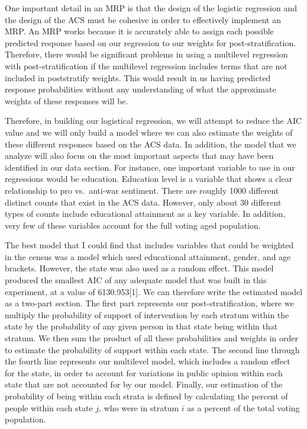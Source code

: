 \documentclass[
  11pt,
]{article}
\begin{document}
One important detail in an MRP is that the design of the logistic
regression and the design of the ACS must be cohesive in order to
effectively implement an MRP. An MRP works because it is accurately able
to assign each possible predicted response based on our regression to
our weights for post-stratification. Therefore, there would be
significant problems in using a multilevel regression with
post-stratification if the multilevel regression includes terms that are
not included in poststratify weights. This would result in us having
predicted response probabilities without any understanding of what the
approximate weights of these responses will be.

Therefore, in building our logistical regression, we will attempt to
reduce the AIC value and we will only build a model where we can also
estimate the weights of these different responses based on the ACS data.
In addition, the model that we analyze will also focus on the most
important aspects that may have been identified in our data section. For
instance, one important variable to use in our regressions would be
education. Education level is a variable that shows a clear relationship
to pro vs.~anti-war sentiment. There are roughly 1000 different distinct
counts that exist in the ACS data. However, only about 30 different
types of counts include educational attainment as a key variable. In
addition, very few of these variables account for the full voting aged
population.

The best model that I could find that includes variables that could be
weighted in the census was a model which used educational attainment,
gender, and age brackets. However, the state was also used as a random
effect. This model produced the smallest AIC of any adequate model that
was built in this experiment, at a value of 6130.953{[}1{]}. We can
therefore write the estimated model as a two-part section. The first
part represents our post-stratification, where we multiply the
probability of support of intervention by each stratum within the state
by the probability of any given person in that state being within that
stratum. We then sum the product of all these probabilities and weights
in order to estimate the probability of support within each state. The
second line through the fourth line represents our multilevel model,
which includes a random effect for the state, in order to account for
variations in public opinion within each state that are not accounted
for by our model. Finally, our estimation of the probability of being
within each strata is defined by calculating the percent of people
within each state \(j\), who were in stratum \(i\) as a percent of the
total voting population.
\end{document}

